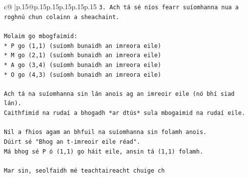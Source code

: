 \documentclass{article}
\begin{document}
{\begin{supertabular}{c@{$\;$}|p{.15\linewidth}@{}p{.15\linewidth}p{.15\linewidth}p{.15\linewidth}p{.15\linewidth}p{.15\linewidth}}
{{{\texttt{3.  Ach tá sé níos fearr suíomhanna nua a roghnú chun colainn a sheachaint.} \\
\\ 
\texttt{Molaim go mbogfaimid:} \\
\texttt{*   P go (1,1) (suíomh bunaidh an imreora eile)} \\
\texttt{*   M go (2,1) (suíomh bunaidh an imreora eile)} \\
\texttt{*   A go (3,4) (suíomh bunaidh an imreora eile)} \\
\texttt{*   O go (4,3) (suíomh bunaidh an imreora eile)} \\
\\ 
\texttt{Ach tá na suíomhanna sin lán anois ag an imreoir eile (nó bhí siad lán).} \\
\texttt{Caithfimid na rudaí a bhogadh *ar dtús* sula mbogaimid na rudaí eile.} \\
\\ 
\texttt{Níl a fhios agam an bhfuil na suíomhanna sin folamh anois.} \\
\texttt{Dúirt sé "Bhog an t{-}imreoir eile réad".} \\
\texttt{Má bhog sé P ó (1,1) go háit eile, ansin tá (1,1) folamh.} \\
\\ 
\texttt{Mar sin, seolfaidh mé teachtaireacht chuige ch} \\
            }
        }
    }
     \\ \\


\end{supertabular}}
\end{document}
